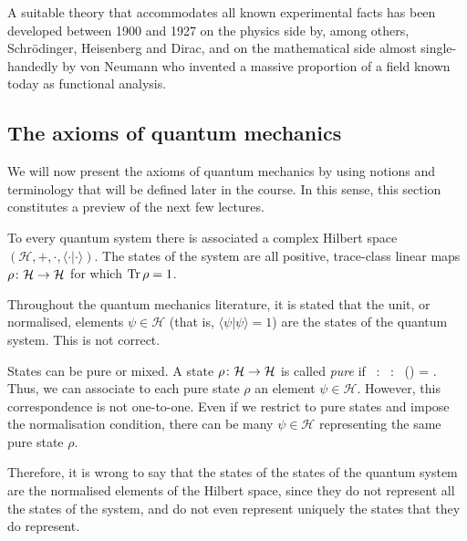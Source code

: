 A suitable theory that accommodates all known experimental facts has been developed between 1900 and 1927 on the physics side by, among others, Schr\"odinger, Heisenberg and Dirac, and on the mathematical side almost single-handedly by von Neumann who invented a massive proportion of a field known today as functional analysis.

\subsection{The axioms of quantum mechanics}

We will now present the axioms of quantum mechanics by using notions and terminology that will be defined later in the course. In this sense, this section constitutes a preview of the next few lectures. 

\begin{tcolorbox}[colframe=blue!10!black,before skip=10pt,after skip=10pt]
\begin{axiom}
To every quantum system there is associated a complex Hilbert space $(\mathcal{H},+,\cdot,\langle \cdot | \cdot \rangle)$. The states of the system are all positive, trace-class linear maps $\rho\colon \mathcal{H}\to \mathcal{H}$ for which $\operatorname{Tr}\rho=1$.
\end{axiom}
\end{tcolorbox}

\br
Throughout the quantum mechanics literature, it is stated that the unit, or normalised, elements $\psi\in\mathcal{H}$ (that is, $\langle\psi|\psi\rangle=1$) are the states of the quantum system. This is not correct. 

States can be pure or mixed. A state $\rho\colon \mathcal{H}\to \mathcal{H}$ is called \emph{pure} if
\bse
\exists \, \psi\in {} : \forall \, \alpha\in {} : \ \rho(\alpha) = \frac{\langle\psi|\alpha\rangle}{\langle\psi|\psi\rangle}\psi.
\ese
Thus, we can associate to each pure state $\rho$ an element $\psi\in\mathcal{H}$. However, this correspondence is not one-to-one. Even if we restrict to pure states and impose the normalisation condition, there can be many $\psi\in\mathcal{H}$ representing the same pure state $\rho$. 

Therefore, it is wrong to say that the states of the states of the quantum system are the normalised elements of the Hilbert space, since they do not represent all the states of the system, and do not even represent uniquely the states that they do represent.
\er

